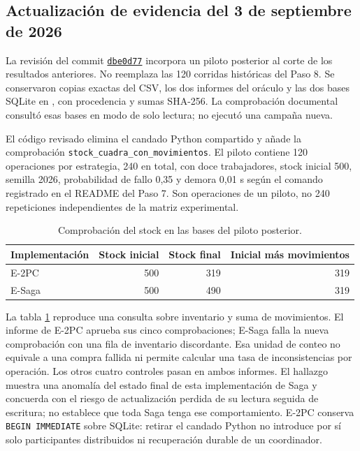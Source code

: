 \subsection{Actualización de evidencia del 3 de septiembre de 2026}\label{sec:actualizacion-evidencias}
La revisión del commit \href{https://github.com/JoseLozanoMorales/TiendaTech/commit/dbe0d772fe36b9a4a836dc9101eeb0c6cb6c25d9}{\texttt{dbe0d77}} incorpora un piloto posterior al corte de los resultados anteriores. No reemplaza las 120 corridas históricas del Paso 8. Se conservaron copias exactas del CSV, los dos informes del oráculo y las dos bases SQLite en , con procedencia y sumas SHA-256. La comprobación documental consultó esas bases en modo de solo lectura; no ejecutó una campaña nueva.

El código revisado elimina el candado Python compartido y añade la comprobación \texttt{stock\_cuadra\_con\_movimientos}. El piloto contiene 120 operaciones por estrategia, 240 en total, con doce trabajadores, stock inicial 500, semilla 2026, probabilidad de fallo 0,35 y demora 0,01 s según el comando registrado en el README del Paso 7. Son operaciones de un piloto, no 240 repeticiones independientes de la matriz experimental.

\begin{table}[htbp]\centering
\caption{Comprobación del stock en las bases del piloto posterior.}\label{tab:piloto-posterior}
\begin{tabular}{lrrr}\toprule
Implementación & Stock inicial & Stock final & Inicial más movimientos\\\midrule
E-2PC & 500 & 319 & 319\\
E-Saga & 500 & 490 & 319\\\bottomrule
\end{tabular}
\end{table}

La tabla \ref{tab:piloto-posterior} reproduce una consulta sobre inventario y suma de movimientos. El informe de E-2PC aprueba sus cinco comprobaciones; E-Saga falla la nueva comprobación con una fila de inventario discordante. Esa unidad de conteo no equivale a una compra fallida ni permite calcular una tasa de inconsistencias por operación. Los otros cuatro controles pasan en ambos informes. El hallazgo muestra una anomalía del estado final de esta implementación de Saga y concuerda con el riesgo de actualización perdida de su lectura seguida de escritura; no establece que toda Saga tenga ese comportamiento. E-2PC conserva \texttt{BEGIN IMMEDIATE} sobre SQLite: retirar el candado Python no introduce por sí solo participantes distribuidos ni recuperación durable de un coordinador.


